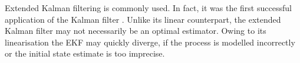 Extended Kalman filtering is commonly used. In fact, it was the first successful application of the Kalman filter \cite{grewal2008kalman}. Unlike its linear counterpart, the extended Kalman filter may not necessarily be an optimal estimator. Owing to its linearisation the EKF may quickly diverge, if the process is modelled incorrectly or the initial state estimate is too imprecise.


